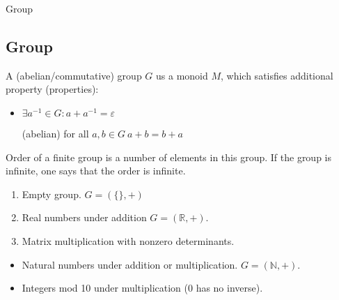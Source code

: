 \documentclass{beamer}
\begin{document}
\begin{frame}{Group}
	\subsection{Group}
	\begin{definition}
		A (abelian/commutative) group $G$ us a monoid $M$, which satisfies additional property (properties):
		\begin{itemize}
			\item $\exists a^{-1} \in G : a + a^{-1} = \varepsilon$
			\item[(abelian)] for all $a, b \in G\ a + b = b + a$
		\end{itemize}
	\end{definition}
	\begin{definition}
		Order of a finite group is a number of elements in this group. If the group is infinite, one says that the order
		is infinite.
	\end{definition}
	\begin{example}[Groups]
		\begin{enumerate}
			\item Empty group. $G = (\{\}, +)$
			\item Real numbers under addition $G = (\mathbb{R}, +)$.
			\item Matrix multiplication with nonzero determinants.
		\end{enumerate}
	\end{example}
	\begin{example}
		\begin{itemize}
			\item Natural numbers under addition or multiplication. $G = (\mathbb{N}, +)$.
			\item Integers mod 10 under multiplication (0 has no inverse).
		\end{itemize}
	\end{example}
\end{frame}
\end{document}
